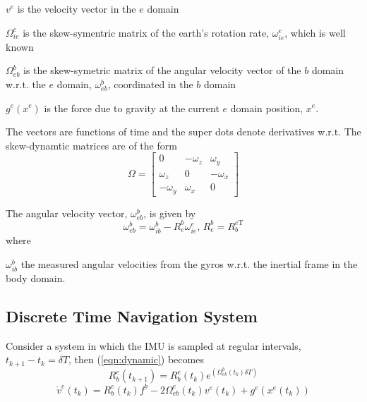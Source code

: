 \documentclass[a4paper]{report}
\numberwithin{equation}{chapter}
\begin{document}
  $v^e$ is the velocity vector in the $e$ domain

  $\Omega^e_{ie}$ is the skew-symentric matrix of the earth's rotation rate, $\omega^e_{ie}$, which is well known

  $\Omega^b_{eb}$ is the skew-symetric matrix of the angular velocity vector of the $b$ domain w.r.t. the $e$ domain, $\omega^b_{eb}$, coordinated in the $b$ domain

  $g^e \left( x^e \right)$ is the force due to gravity at the current $e$ domain position, $x^e$.

\bigskip

The vectors are functions of time and the super dots denote derivatives w.r.t. The skew-dynamtic matrices are of the form
\begin{equation}
\Omega =
\begin{bmatrix}
0 & - \omega_z & \omega_y\\
\omega_z & 0 & - \omega_x\\
- \omega_y & \omega_x & 0
\end{bmatrix}
\end{equation}

The angular velocity vector, $\omega^b_{eb}$, is given by
\begin{equation}
\omega^b_{eb} = \omega^b_{ib} - R^b_e \omega^e_{ie}
\text{, }
R^b_e = R^{e\mathrm{T}}_b
\end{equation}
where

  $\omega^b_{ib}$ the measured angular velocities from the gyros w.r.t. the inertial frame in the body domain.

\subsection[Discrete Time Navigation System]{Discrete Time Navigation System}

Consider a system in which the IMU is sampled at regular intervals, $t_{k+1} - t_k = \delta{T}$, then (\ref{eqn:dynamic}) becomes
\begin{equation}
R^e_b \left( t_{k + 1} \right) = R^e_b \left( t_k \right) e^{\left( \Omega^b_{eb} \left( t_k \right) \delta{T} \right)}
\end{equation}
\begin{equation}
\dot{v}^e \left( t_k \right) = R^e_b \left( t_k \right) f^b - 2 \Omega^e_{eb} \left( t_k \right) v^e \left( t_k \right) + g^e \left( x^e \left( t_k \right) \right)
\end{equation}
\end{document}
